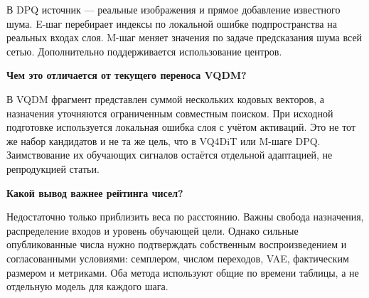 \documentclass[a4paper,11pt]{article}
\newcommand{\question}[1]{\par\textbf{#1}\par}
\begin{document}
В DPQ источник --- реальные изображения
и прямое добавление известного шума.
E-шаг перебирает индексы по локальной
ошибке подпространства на реальных входах слоя.
M-шаг меняет значения по задаче
предсказания шума всей сетью.
Дополнительно поддерживается использование центров.

\question{Чем это отличается от текущего переноса VQDM?}
В VQDM фрагмент представлен суммой нескольких
кодовых векторов, а назначения уточняются
ограниченным совместным поиском. При исходной
подготовке используется локальная ошибка
слоя с учётом активаций. Это не тот же
набор кандидатов и не та же цель,
что в VQ4DiT или M-шаге DPQ.
Заимствование их обучающих сигналов остаётся
отдельной адаптацией, не репродукцией статьи.

\question{Какой вывод важнее рейтинга чисел?}
Недостаточно только приблизить веса по расстоянию.
Важны свобода назначения, распределение входов
и уровень обучающей цели. Однако сильные
опубликованные числа нужно подтверждать
собственным воспроизведением и согласованными
условиями: семплером, числом переходов,
VAE, фактическим размером и метриками.
Оба метода используют общие по времени
таблицы, а не отдельную модель для каждого шага.
\end{document}
